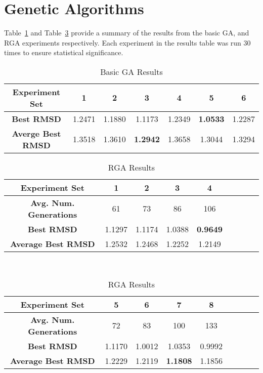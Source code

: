 \section{Genetic Algorithms}
\label{sec:ga-analysis}

Table~\ref{table:basic-ga-results} and Table~\ref{table:rga-results} provide a summary of the results from the basic GA, and RGA experiments respectively. Each experiment in the results table was run 30 times to ensure statistical significance.

\begin{table}
	\centering
	\begin{tabular}{ | >{\bfseries}c | c | c | c | c | c | c | }
		\hline
		Experiment Set & 1 & 2 & 3 & 4 & 5 & 6 \\ \hline
		Best RMSD & 1.2471 & 1.1880 & 1.1173 & 1.2349 & \textbf{1.0533} & 1.2287 \\ \hline
		Averge Best RMSD & 1.3518 & 1.3610 & \textbf{1.2942} & 1.3658 & 1.3044 & 1.3294 \\ \hline
	\end{tabular}
	\caption{Basic GA Results}
	\label{table:basic-ga-results}
\end{table}

\begin{table}
	\centering
	\begin{tabular}{ | >{\bfseries}c | c | c | c | c | c | c | c | c | }
		\hline
		Experiment Set & 1 & 2 & 3 & 4 \\ \hline
		Avg. Num. Generations & 61 & 73 & 86 & 106 \\ \hline
		Best RMSD & 1.1297 & 1.1174 & 1.0388 & \textbf{0.9649} \\ \hline
		Average Best RMSD & 1.2532 & 1.2468 & 1.2252 & 1.2149 \\ \hline
	\end{tabular}
	\\
	\vspace{3 mm}
	\begin{tabular}{ | >{\bfseries}c | c | c | c | c | c | c | c | c | }
		\hline
		Experiment Set & 5 & 6 & 7 & 8 \\ \hline
		Avg. Num. Generations & 72 & 83 & 100 & 133 \\ \hline
		Best RMSD & 1.1170 & 1.0012 & 1.0353 & 0.9992 \\ \hline
		Average Best RMSD & 1.2229 & 1.2119 & \textbf{1.1808} & 1.1856 \\ \hline
	\end{tabular}
	\caption{RGA Results}
	\label{table:rga-results}
\end{table}

